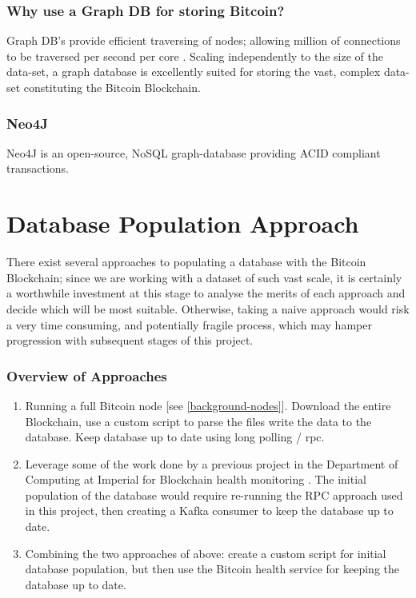 \subsubsection{Why use a Graph DB for storing Bitcoin?}
Graph DB's provide efficient traversing of nodes; allowing million of connections to be traversed per second per core \cite{RefWorks:doc:5c98f0c6e4b00cbb4da393d8}. Scaling independently to the size of the data-set, a graph database is excellently suited for storing the vast, complex data-set constituting the Bitcoin Blockchain. 

\subsubsection{Neo4J}
Neo4J is an open-source, NoSQL graph-database providing ACID compliant transactions.



\section{Database Population Approach}
There exist several approaches to populating a database with the Bitcoin Blockchain; since we are working with a dataset of such vast scale, it is certainly a worthwhile investment at this stage to analyse the merits of each approach and decide which will be most suitable. Otherwise, taking a naive approach would risk a very time consuming, and potentially fragile process, which may hamper progression with subsequent stages of this project. 

\subsubsection{Overview of Approaches}
\begin{enumerate}
    \item Running a full Bitcoin node [see \ref{background-nodes}]. Download the entire Blockchain, use a custom script to parse the files write the data to the database. Keep database up to date using long polling / \gls{rpc}. 
    \item Leverage some of the work done by a previous project in the Department of Computing at Imperial for Blockchain health monitoring \cite{RefWorks:doc:5c6bd151e4b041254f892045}. The initial population of the database would require re-running the RPC approach used in this project, then creating a Kafka consumer to keep the database up to date. 
    \item Combining the two approaches of above: create a custom script for initial database population, but then use the Bitcoin health service for keeping the database up to date. 
\end{enumerate}

